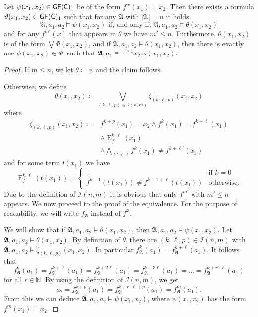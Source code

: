 \begin{lemma}
	Let $\psi(x_1,x_2)\in \mathsf{GF}(\mathsf{C})_1$ be of the form $f^m(x_1)=x_2$. 
	Then there exists a formula $\vartheta(x_1,x_2)\in \mathsf{GF}(\mathsf{C})_1$ such that for any $\mathfrak A$ with $\vert \mathfrak A\vert=n$ it holds
	$$\mathfrak A,a_1,a_2 \models \psi(x_1,x_2) \text{ if, and only if, } \mathfrak A,a_1,a_2 \models \theta(x_1,x_2)$$ 
	and for any $f^{m'}(x)$ that appears in $\theta$ we have $m'\leq n$.
	Furthermore, $\theta(x_1,x_2)$ is of the form $\bigvee \Phi(x_1,x_2)$, and if $\mathfrak A,a_1,a_2\models \theta(x_1,x_2)$, then there is exactly one $\phi(x_1,x_2)\in\Phi$, such that $\mathfrak A,a_1\models \exists^{\geq 1} x_2 . \phi(x_1,x_2)$.
	\label{Simple_fm_to_fk}
\end{lemma}
\begin{proof}
	If $m \leq n$, we let $\theta\coloneqq\psi$ and the claim follows.
	
	Otherwise, we define
	$$\theta(x_1,x_2)\coloneqq \bigvee_{(k,\ell,p)\in \mathcal I(n,m)} \zeta_{(k,\ell,p)}(x_1,x_2)$$
	where
	\begin{align*}
		\zeta_{(k,\ell,p)}(x_1,x_2)\coloneqq & f^{k+p}(x_1)=x_2 \land f^{k}(x_1)=f^{k+\ell}(x_1) \\
		& \land \operatorname{E}^{k,\ell}_{f}(x_1)  \\
		& \land \bigwedge_{\ell'<\ell}f^{k}(x_1)\neq f^{k+\ell'}(x_1)
	\end{align*}
	and for some term $t(x_1)$ we have
	$$\operatorname{E}^{k,\ell}_{f}(t(x_1))=\begin{cases}
		\top & \text{if } k=0 \\
		f^{k-1}(t(x_1))\neq f^{k-1+\ell}(t(x_1)) & \text{otherwise}.
	\end{cases}$$
	Due to the definition of $\mathcal I(n,m)$ it is obvious that only $f^{m'}$ with $m'\leq n$ appears.
	We now proceed to the proof of the equivalence.
	For the purpose of readability, we will write $f_{\mathfrak A}$ instead of $f^{\mathfrak A}$.
	
	We will show that if $\mathfrak A,a_1,a_2 \models \theta(x_1,x_2)$, then $\mathfrak A,a_1,a_2 \models \psi(x_1,x_2)$.
	Let $\mathfrak A,a_1,a_2 \models \theta(x_1,x_2)$. 
	By definition of $\theta$, there are $(k,\ell,p)\in \mathcal I(n,m)$ with $\mathfrak A,a_1,a_2 \models \zeta_{(k,\ell,p)}(x_1,x_2)$.
	In particular $f_{\mathfrak A}^{k}(a_1)=f_{\mathfrak A}^{k+\ell}(a_1)$. It follows that
	$$f_{\mathfrak A}^{k}(a_1)=f_{\mathfrak A}^{k+\ell}(a_1)=f_{\mathfrak A}^{k+2\ell}(a_1)=f_{\mathfrak A}^{k+3\ell}(a_1) = \dots = f_{\mathfrak A}^{k+r\cdot \ell}(a_1)$$
	for all $r\in \mathbb N$. By using the definition of $\mathcal{I}(n,m)$, we get
	$$a_2 =f_{\mathfrak A}^{k+p}(a_1) = f_{\mathfrak A}^{k+r\cdot \ell + p}(a_1)=f_{\mathfrak A}^{m}(a_1).$$
	From this we can deduce $\mathfrak A,a_1,a_2\models \psi(x_1,x_2)$, where $\psi(x_1,x_2)$ has the form $f^{m}(x_1)=x_2$.
	

\end{proof}
